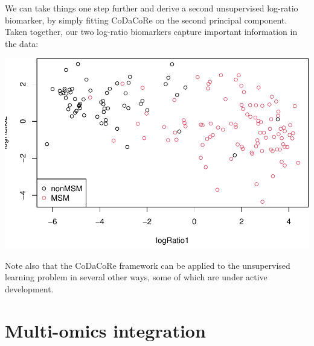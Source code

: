 \documentclass[
]{article}
\newenvironment{Shaded}{\begin{snugshade}}{\end{snugshade}}
\newcommand{\AttributeTok}[1]{\textcolor[rgb]{0.77,0.63,0.00}{#1}}
\newcommand{\DecValTok}[1]{\textcolor[rgb]{0.00,0.00,0.81}{#1}}
\newcommand{\FunctionTok}[1]{\textcolor[rgb]{0.00,0.00,0.00}{#1}}
\newcommand{\NormalTok}[1]{#1}
\newcommand{\OtherTok}[1]{\textcolor[rgb]{0.56,0.35,0.01}{#1}}
\newcommand{\SpecialCharTok}[1]{\textcolor[rgb]{0.00,0.00,0.00}{#1}}
\newcommand{\StringTok}[1]{\textcolor[rgb]{0.31,0.60,0.02}{#1}}
\begin{document}
We can take things one step further and derive a second unsupervised
log-ratio biomarker, by simply fitting CoDaCoRe on the second principal
component. Taken together, our two log-ratio biomarkers capture
important information in the data:

\begin{Shaded}
\end{Shaded}

\includegraphics{guide_files/figure-latex/unnamed-chunk-23-1.pdf}

Note also that the CoDaCoRe framework can be applied to the unsupervised
learning problem in several other ways, some of which are under active
development.

\hypertarget{multi-omics-integration}{%
\section{Multi-omics integration}\label{multi-omics-integration}}
\end{document}
